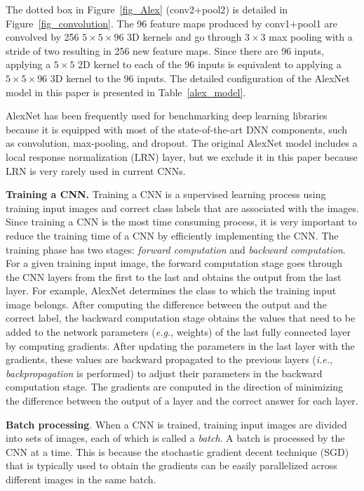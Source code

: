 The dotted box in Figure~\ref{fig_Alex} (\textsf{conv2}+\textsf{pool2}) is detailed in Figure~\ref{fig_convolution}. The 96 feature maps produced by \textsf{conv1}+\textsf{pool1} are convolved by 256 $5 \times 5 \times 96$ 3D kernels and go through $3 \times 3$ max pooling with a stride of two resulting in 256 new feature maps. Since there are 96 inputs, applying a $5 \times 5$ 2D kernel to each of the 96 inputs is equivalent to applying a $5 \times 5 \times 96$ 3D kernel to the 96 inputs. The detailed configuration of the AlexNet model in this paper is presented in Table~\ref{alex_model}.

AlexNet has been frequently used for benchmarking deep learning libraries because it is equipped with most of the state-of-the-art DNN components, such as convolution, max-pooling, and dropout\cite{convnet-benchmarks}. The original AlexNet model includes a local response normalization (LRN) layer, but we exclude it in this paper because LRN is very rarely used in current CNNs. 

{\bf Training a CNN.} Training a CNN is a supervised learning process using training input images and correct class labels that are associated with the images. Since training a CNN is the most time consuming process, it is very important to reduce the training time of a CNN by efficiently implementing the CNN. The training phase has two stages: \textit{forward computation} and \textit{backward computation}. For a given training input image, the forward computation stage goes through the CNN layers from the first to the last and obtains the output from the last layer. For example, AlexNet determines the class to which the training input image belongs. After computing the difference between the output and the correct label, the backward computation stage obtains the values that need to be added to the network parameters (\textit{e.g.}, weights) of the last fully connected layer by computing gradients. After updating the parameters in the last layer with the gradients, these values are backward propagated to the previous layers (\textit{i.e.}, \textit{backpropagation} is performed) to adjust their parameters in the backward computation stage. The gradients are computed in the direction of minimizing the difference between the output of a layer and the correct answer for each layer.

{\bf Batch processing}. When a CNN is trained, training input images are divided into sets of images, each of which is called a \textit{batch}. A batch is processed by the CNN at a time. This is because the stochastic gradient decent technique (SGD)\cite{onlinesgd} that is typically used to obtain the gradients can be easily parallelized across different images in the same batch. 

